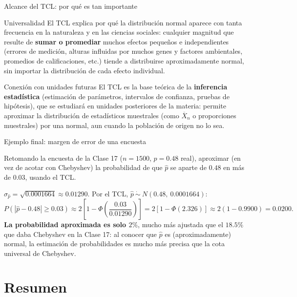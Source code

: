 \documentclass[aspectratio=169,11pt]{beamer}
\begin{document}
\begin{frame}{Alcance del TCL: por qué es tan importante}
\begin{alertblock}{Universalidad}
El TCL explica por qué la distribución normal aparece con tanta frecuencia en la naturaleza y en las ciencias sociales: cualquier magnitud que resulte de \textbf{sumar o promediar} muchos efectos pequeños e independientes (errores de medición, alturas influidas por muchos genes y factores ambientales, promedios de calificaciones, etc.) tiende a distribuirse aproximadamente normal, sin importar la distribución de cada efecto individual.
\end{alertblock}

\begin{block}{Conexión con unidades futuras}
El TCL es la base teórica de la \textbf{inferencia estadística} (estimación de parámetros, intervalos de confianza, pruebas de hipótesis), que se estudiará en unidades posteriores de la materia: permite aproximar la distribución de estadísticos muestrales (como $\overline X_n$ o proporciones muestrales) por una normal, aun cuando la población de origen no lo sea.
\end{block}
\end{frame}

\begin{frame}{Ejemplo final: margen de error de una encuesta}
\begin{example}
Retomando la encuesta de la Clase 17 ($n=1500$, $p=0.48$ real), aproximar (en vez de acotar con Chebyshev) la probabilidad de que $\hat p$ se aparte de $0.48$ en más de $0.03$, usando el TCL.
\end{example}

\medskip
$\sigma_{\hat p} = \sqrt{0.0001664}\approx 0.01290$. Por el TCL, $\hat p \ \dot\sim\ N(0.48,\ 0.0001664)$:
\[
P(|\hat p-0.48|\geq 0.03) \approx 2\left[1-\Phi\left(\frac{0.03}{0.01290}\right)\right] = 2[1-\Phi(2.326)] \approx 2(1-0.9900) = 0.0200.
\]
\textbf{La probabilidad aproximada es solo $2\%$}, mucho más ajustada que el $18.5\%$ que daba Chebyshev en la Clase 17: al conocer que $\hat p$ es (aproximadamente) normal, la estimación de probabilidades es mucho más precisa que la cota universal de Chebyshev.
\end{frame}

\section{Resumen}
\end{document}

